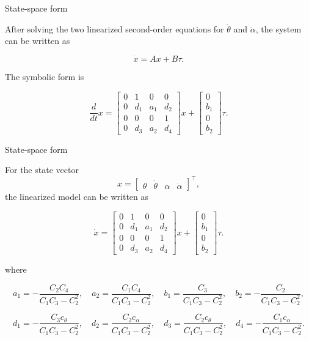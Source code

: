 \documentclass[aspectratio=169]{beamer}
\begin{document}
\begin{frame}{State-space form}



After solving the two linearized second-order equations for $\ddot{\theta}$ and $\ddot{\alpha}$, the system can be written as

\[
\dot{x}=Ax+B\tau .
\]

\vspace{0.2cm}

The symbolic form is

\[
\frac{d}{dt}x=
\begin{bmatrix}
0 & 1 & 0 & 0 \\
0 & d_1 & a_1 & d_2 \\
0 & 0 & 0 & 1 \\
0 & d_3 & a_2 & d_4
\end{bmatrix}x
+
\begin{bmatrix}
0 \\ b_1 \\ 0 \\ b_2
\end{bmatrix}\tau .
\]

\vspace{0.1cm}



\end{frame}

\begin{frame}{State-space form}

For the state vector
\[
x=
\begin{bmatrix}
\theta & \dot{\theta} & \alpha & \dot{\alpha}
\end{bmatrix}^{\top},
\]
the linearized model can be written as

\[
\dot{x}
=
\begin{bmatrix}
0 & 1 & 0 & 0 \\
0 & d_1 & a_1 & d_2 \\
0 & 0 & 0 & 1 \\
0 & d_3 & a_2 & d_4
\end{bmatrix}x
+
\begin{bmatrix}
0 \\ b_1 \\ 0 \\ b_2
\end{bmatrix}\tau.
\]

\vspace{-0.4cm}

where

\[
a_1=-\frac{C_2C_4}{C_1C_3-C_2^2},
\quad
a_2=\frac{C_1C_4}{C_1C_3-C_2^2},
\quad
b_1=\frac{C_3}{C_1C_3-C_2^2},
\quad
b_2=-\frac{C_2}{C_1C_3-C_2^2},
\]

\[
d_1=-\frac{C_3c_\theta}{C_1C_3-C_2^2},
\quad
d_2=\frac{C_2c_\alpha}{C_1C_3-C_2^2},
\quad
d_3=\frac{C_2c_\theta}{C_1C_3-C_2^2},
\quad
d_4=-\frac{C_1c_\alpha}{C_1C_3-C_2^2}.
\]

\end{frame}
\end{document}
